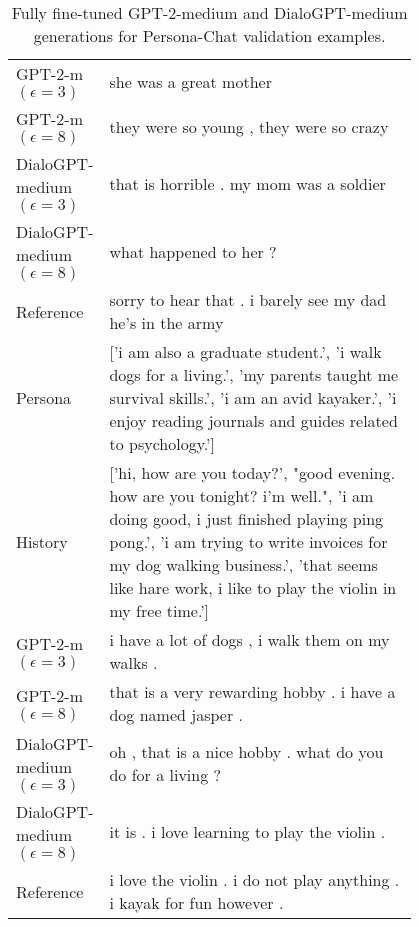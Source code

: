 \begin{table}[h]
\begin{tabular}{l | p{0.8\linewidth}}
 \hline
GPT-2-m $(\epsilon=3)$ & she was a great mother \\
GPT-2-m $(\epsilon=8)$ & they were so young , they were so crazy \\
DialoGPT-medium $(\epsilon=3)$ & that is horrible . my mom was a soldier \\
DialoGPT-medium $(\epsilon=8)$ & what happened to her ? \\
\hline
 Reference & sorry to hear that . i barely see my dad he's in the army \\
\midrule\midrule
Persona & ['i am also a graduate student.', 'i walk dogs for a living.', 'my parents taught me survival skills.', 'i am an avid kayaker.', 'i enjoy reading journals and guides related to psychology.'] \\
 \hline
History & ['hi, how are you today?', "good evening. how are you tonight? i'm well.", 'i am doing good, i just finished playing ping pong.', 'i am trying to write invoices for my dog walking business.', 'that seems like hare work, i like to play the violin in my free time.'] \\
 \hline
GPT-2-m $(\epsilon=3)$ & i have a lot of dogs , i walk them on my walks . \\
GPT-2-m $(\epsilon=8)$ & that is a very rewarding hobby . i have a dog named jasper . \\
DialoGPT-medium $(\epsilon=3)$ & oh , that is a nice hobby . what do you do for a living ? \\
DialoGPT-medium $(\epsilon=8)$ & it is . i love learning to play the violin . \\
\hline
 Reference & i love the violin . i do not play anything . i kayak for fun however . \\
\bottomrule
\end{tabular}
\caption{Fully fine-tuned GPT-2-medium and DialoGPT-medium generations for Persona-Chat validation examples.}
\end{table}
